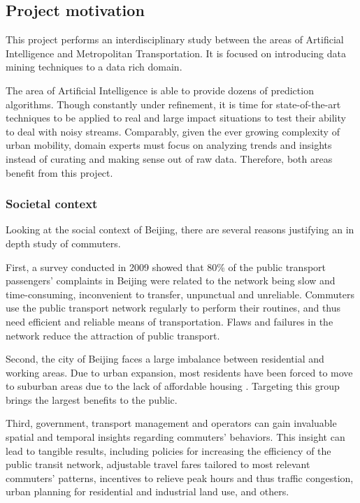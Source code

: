 \documentclass{article}
\begin{document}
\subsection{Project motivation}
This project performs an interdisciplinary study between the areas of Artificial Intelligence and Metropolitan Transportation. It is focused on introducing data mining techniques to a data rich domain. 

The area of Artificial Intelligence is able to provide dozens of prediction algorithms. Though constantly under refinement, it is time for state-of-the-art techniques to be applied to real and large impact situations to test their ability to deal with noisy streams. Comparably, given the ever growing complexity of urban mobility, domain experts must focus on analyzing trends and insights instead of curating and making sense out of raw data. Therefore, both areas benefit from this project.

\subsubsection{Societal context}
Looking at the social context of Beijing, there are several reasons justifying an in depth study of commuters. 

First, a survey conducted in 2009 showed that 80\% of the public transport passengers' complaints in Beijing were related to the network being slow and time-consuming, inconvenient to transfer, unpunctual and unreliable. Commuters use the public transport network regularly to perform their routines, and thus need efficient and reliable means of transportation. Flaws and failures in the network reduce the attraction of public transport. \cite{beijing2009research}

Second, the city of Beijing faces a large imbalance between residential and working areas. Due to urban expansion, most residents have been forced to move to suburban areas due to the lack of affordable housing \cite{zhou2014commuting}. Targeting this group brings the largest benefits to the public.  

Third, government, transport management and operators can gain invaluable spatial and temporal insights regarding commuters' behaviors. This insight can lead to tangible results, including policies for increasing the efficiency of the public transit network, adjustable travel fares tailored to most relevant commuters' patterns, incentives to relieve peak hours and thus traffic congestion, urban planning for residential and industrial land use, and others.
\end{document}
